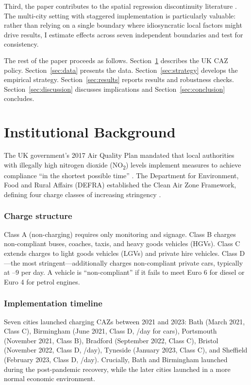\documentclass[12pt]{article}
\begin{document}
Third, the paper contributes to the spatial regression discontinuity literature \citep{keele2015, dell2010, blacksmith2004}. The multi-city setting with staggered implementation is particularly valuable: rather than relying on a single boundary where idiosyncratic local factors might drive results, I estimate effects across seven independent boundaries and test for consistency.

The rest of the paper proceeds as follows. Section~\ref{sec:background} describes the UK CAZ policy. Section~\ref{sec:data} presents the data. Section~\ref{sec:strategy} develops the empirical strategy. Section~\ref{sec:results} reports results and robustness checks. Section~\ref{sec:discussion} discusses implications and Section~\ref{sec:conclusion} concludes.

\section{Institutional Background}\label{sec:background}

The UK government's 2017 Air Quality Plan mandated that local authorities with illegally high nitrogen dioxide (NO\textsubscript{2}) levels implement measures to achieve compliance ``in the shortest possible time'' \citep{defra2017}. The Department for Environment, Food and Rural Affairs (DEFRA) established the Clean Air Zone Framework, defining four charge classes of increasing stringency \citep{defra2020}.

\subsubsection*{Charge structure} Class A (non-charging) requires only monitoring and signage. Class B charges non-compliant buses, coaches, taxis, and heavy goods vehicles (HGVs). Class C extends charges to light goods vehicles (LGVs) and private hire vehicles. Class D---the most stringent---additionally charges non-compliant private cars, typically at --9 per day. A vehicle is ``non-compliant'' if it fails to meet Euro 6 for diesel or Euro 4 for petrol engines.

\subsubsection*{Implementation timeline} Seven cities launched charging CAZs between 2021 and 2023: Bath (March 2021, Class C), Birmingham (June 2021, Class D, /day for cars), Portsmouth (November 2021, Class B), Bradford (September 2022, Class C), Bristol (November 2022, Class D, /day), Tyneside (January 2023, Class C), and Sheffield (February 2023, Class D, /day). Crucially, Bath and Birmingham launched during the post-pandemic recovery, while the later cities launched in a more normal economic environment.
\end{document}
